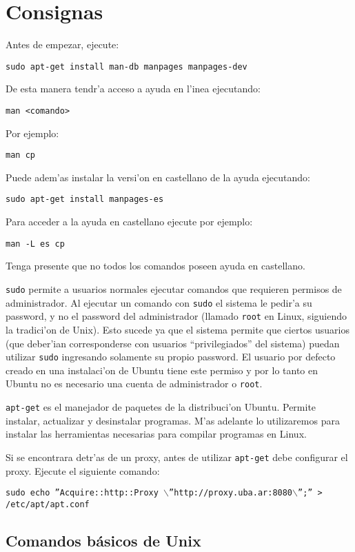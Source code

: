 \section{Consignas}

Antes de empezar, ejecute:

\texttt{sudo apt-get install man-db manpages manpages-dev}


De esta manera tendr'a acceso a ayuda en l'inea ejecutando:

\texttt{man <comando>}

Por ejemplo:

\texttt{man cp}

Puede adem'as instalar la versi'on en castellano de la ayuda ejecutando:

\texttt{sudo apt-get install manpages-es}

Para acceder a la ayuda en castellano ejecute por ejemplo:

\texttt{man -L es cp}

Tenga presente que no todos los comandos poseen ayuda en castellano.

\texttt{sudo} permite a usuarios normales ejecutar comandos que requieren permisos de administrador.
Al ejecutar un comando con \texttt{sudo} el sistema le pedir'a su password, y no el password del administrador
(llamado \texttt{root} en Linux, siguiendo la tradici'on de Unix). Esto sucede ya que el sistema permite que
ciertos usuarios (que deber'ian corresponderse con usuarios ``privilegiados'' del sistema) puedan utilizar \texttt{sudo}
ingresando solamente su propio password. El usuario por defecto creado en una instalaci'on de Ubuntu tiene este permiso
y por lo tanto en Ubuntu no es necesario una cuenta de administrador o \texttt{root}.

\texttt{apt-get} es el manejador de paquetes de la distribuci'on Ubuntu. Permite instalar, actualizar y desinstalar
programas. M'as adelante lo utilizaremos para instalar las herramientas necesarias para compilar programas en
Linux.

Si se encontrara detr'as de un proxy, antes de utilizar \texttt{apt-get} debe configurar el proxy. Ejecute el siguiente
comando:

\small
\texttt{sudo echo ''Acquire::http::Proxy $\backslash$''http://proxy.uba.ar:8080$\backslash$'';'' > /etc/apt/apt.conf}
\normalsize

\subsection{Comandos b\'asicos de Unix}

